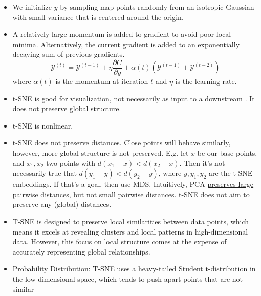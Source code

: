 \documentclass{article}
\begin{document}
\begin{theorem} \hphantom{}
\begin{itemize}

  \item We initialize  $y$ by sampling map points randomly from an isotropic Gaussian with small variance that is centered around the origin. 
  \item A relatively large momentum is added to gradient to avoid poor local minima. Alternatively, the current gradient is added to an exponentially decaying sum of previous gradients.
  \[
    \mathcal{Y}^{(t)} = \mathcal{Y}^{(t-1)} + \eta \frac{\partial C}{\partial y} + \alpha(t) (\mathcal{Y}^{(t-1)} + \mathcal{Y}^{(t-2)} ) 
  \]
  where $\alpha(t)$ is the momentum at iteration $t$ and $\eta$ is the learning rate.  

\end{itemize}

\end{theorem}


\begin{remark} \hphantom{}
\begin{itemize}

  \item t-SNE is good for visualization, not necessarily as input to a downstream . It does not preserve global structure. 
  \item t-SNE is nonlinear.
  \item t-SNE \ul{does not} preserve distances. Close points will behave similarly, however, more global structure is not preserved. E.g. let $x$ be our base points, and $x_1, x_2$ two points with $d(x_1-x) < d(x_2-x)$. Then it's not necessarily true that $d(y_1-y) < d(y_2-y)$, where $y,y_1,y_2$ are the t-SNE embeddings. If that's a goal, then use MDS. Intuitively, PCA \href{https://stats.stackexchange.com/a/176801/213861}{preserves large pairwise distances, but not small pairwise distances}. t-SNE does not aim to preserve any (global) distances. 
  \item T-SNE is designed to preserve local similarities between data points, which means it excels at revealing clusters and local patterns in high-dimensional data. However, this focus on local structure comes at the expense of accurately representing global relationships.
 \item  Probability Distribution: T-SNE uses a heavy-tailed Student t-distribution in the low-dimensional space, which tends to push apart points that are not similar

\end{itemize}
\end{remark}
\end{document}
